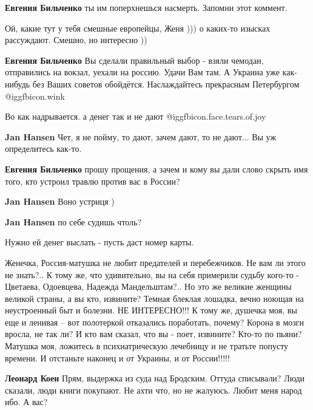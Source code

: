 \begin{itemize}
\begin{itemize}
\textbf{Евгения Бильченко} ты им поперхнешься насмерть. Запомни этот коммент.

Ой, какие тут у тебя смешные европейцы, Женя ))) о каких-то изысках рассуждают. Смешно, но интересно ))

\textbf{Евгения Бильченко} Вы сделали правильный выбор - взяли чемодан, отправились на вокзал, уехали на россию. Удачи Вам там. А Украина уже как-нибудь без Ваших советов обойдётся. Наслаждайтесь прекрасным Петербургом  @igg{fbicon.wink} 
\end{itemize} %


Во как надрывается. а денег так и не дают @igg{fbicon.face.tears.of.joy} 

\begin{itemize} %
\textbf{Jan Hansen} Чет, я не пойму, то дают, зачем дают, то не дают... Вы уж определитесь как-то.

\textbf{Евгения Бильченко} прошу прощения, а зачем и кому вы дали слово скрыть имя того, кто устроил травлю против вас в России?

\textbf{Jan Hansen} Воно устриця )

\textbf{Jan Hansen} по себе судишь чтоль?

Нужно ей денег выслать - пусть даст номер карты.
\end{itemize} %


Женечка, Россия-матушка не любит предателей и перебежчиков. Не вам ли этого не
знать?.. К тому же, что удивительно, вы на себя примерили судьбу кого-то -
Цветаева, Одоевцева, Надежда Мандельштам?.. Но это же великие женщины великой
страны, а вы кто, извините? Темная блеклая лошадка, вечно ноющая на
неустроенный быт и болезни. НЕ ИНТЕРЕСНО!!! К тому же, душечка моя, вы еще и
ленивая – вот полотеркой отказались поработать, почему? Корона в мозги вросла,
не так ли? И кто вам сказал, что вы - поет, извините? Кто-то по пьяни? Матушка
моя, ложитесь в психиатрическую лечебницу и не тратьте попусту времени. И
отстаньте наконец и от Украины, и от России!!!!!

\begin{itemize} %
\textbf{Леонард Коен} Прям, выдержка из суда над Бродским. Оттуда списывали? Люди сказали, люди книги покупают. Не ахти что, но не жалуюсь. Любит меня народ ибо. А вас?



\end{itemize}
\end{itemize}
